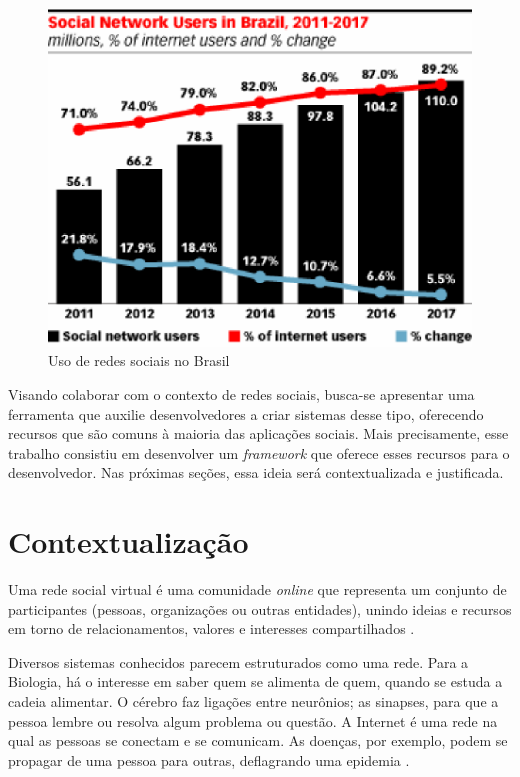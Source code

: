 \begin{figure}[!h]
	\centering
	\includegraphics[scale=0.8]{figuras/introducao/social_network_brazil.eps}
	\caption[Uso de redes sociais no Brasil]{Uso de redes sociais no Brasil \cite{eMarketer:2013}}
	\label{social_network_brazil}
\end{figure}

Visando colaborar com o contexto de redes sociais, busca-se apresentar uma ferramenta que auxilie desenvolvedores a criar sistemas desse tipo, oferecendo recursos que são comuns à maioria das aplicações sociais. Mais precisamente, esse trabalho consistiu em desenvolver um \textit{framework} que oferece esses recursos para o desenvolvedor. Nas próximas seções, essa ideia será contextualizada e justificada.

\section{Contextualização}

Uma rede social virtual é uma comunidade \textit{online} que representa um conjunto de participantes (pessoas, organizações ou outras entidades), unindo ideias e recursos em torno de relacionamentos, valores e interesses compartilhados \cite{Marteleto:2001}.

Diversos sistemas conhecidos parecem estruturados como uma rede. Para a Biologia, há o interesse em saber quem se alimenta de quem, quando se estuda a cadeia alimentar. O cérebro faz ligações entre neurônios; as sinapses, para que a pessoa lembre ou resolva algum problema ou questão. A Internet é uma rede na qual as pessoas se conectam e se comunicam. As doenças, por exemplo, podem se propagar de uma pessoa para outras, deflagrando uma epidemia \cite{Goular:2014}.

